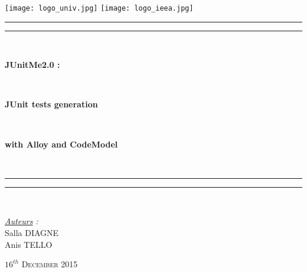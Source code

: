 \thispagestyle{cover}

\texttt{[image: logo\_univ.jpg]}
 \hfill \texttt{[image: logo\_ieea.jpg]} \\

\vspace*{15mm}

\begin{center}

	\vspace*{15mm}

	\rule[0.5ex]{\linewidth}{2pt}\vspace*{-\baselineskip}\vspace*{3.2pt}
	\rule[0.5ex]{\linewidth}{1pt}\\[\baselineskip]

		\begin{Huge} \textbf{JUnitMe2.0 :} \end{Huge}\\[4mm]
		\begin{Huge} \textbf{JUnit tests generation} \end{Huge}\\[4mm]
		\begin{Huge} \textbf{with Alloy and CodeModel} \end{Huge}\\[4mm]
	\rule[0.5ex]{\linewidth}{1pt}\vspace*{-\baselineskip}\vspace{3.2pt}
	\rule[0.5ex]{\linewidth}{2pt}\\

	\vspace*{20mm}

	{\LARGE \textit{\underline{Auteurs} :}}\\
	\vspace*{3mm}
	{\LARGE Salla DIAGNE}\\
	\vspace*{3mm}
	{\LARGE Anis TELLO}\\
	
	\vspace*{20mm}
	
	{\LARGE\textsc{$16^{th}$ December 2015}}
\end{center}
